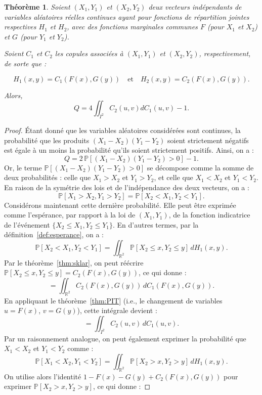 \documentclass[a4paper,11pt]{amsbook}
\numberwithin{equation}{chapter}
\newtheorem{theoreme}			     {Théorème}	[chapter]
\theoremstyle{definition}
\begin{document}
\begin{theoreme}\label{thm:concor}
Soient $(X_1, Y_1)$ et $(X_2, Y_2)$ deux vecteurs indépendants de variables aléatoires réelles continues ayant pour fonctions de répartition jointes respectives $H_1$ et $H_2$, avec des fonctions marginales communes $F$ (pour $X_1$ et $X_2$) et $G$ (pour $Y_1$ et $Y_2$).  

Soient $C_1$ et $C_2$ les copules associées à $(X_1, Y_1)$ et $(X_2, Y_2)$, respectivement, de sorte que :

\[
H_1(x,y) = C_1(F(x),G(y)) \quad \text{et} \quad H_2(x,y) = C_2(F(x),G(y)).
\]

Alors,
\[
Q = 4 \iint_{I^2} C_2(u,v) dC_1(u,v) - 1. 
\]
\end{theoreme}

\begin{proof}
Étant donné que les variables aléatoires considérées sont continues, la probabilité que les produits $(X_1 - X_2)(Y_1 - Y_2)$ soient strictement négatifs est égale à un moins la probabilité qu’ils soient strictement positifs. Ainsi, on a :
\[
Q = 2\, \mathbb{P}\left[(X_1 - X_2)(Y_1 - Y_2) > 0\right] - 1.
\]
Or, le terme $\mathbb{P}\left[(X_1 - X_2)(Y_1 - Y_2) > 0\right]$ se décompose comme la somme de deux probabilités : celle que $X_1 > X_2$ et $Y_1 > Y_2$, et celle que $X_1 < X_2$ et $Y_1 < Y_2$. En raison de la symétrie des lois et de l’indépendance des deux vecteurs, on a :
\[
\mathbb{P}[X_1 > X_2, Y_1 > Y_2] = \mathbb{P}[X_2 < X_1, Y_2 < Y_1].
\]
Considérons maintenant cette dernière probabilité. Elle peut être exprimée comme l’espérance, par rapport à la loi de $(X_1, Y_1)$, de la fonction indicatrice de l’événement $\{X_2 \leq X_1, Y_2 \leq Y_1\}$. En d’autres termes, par la définition~\ref{def:esperance}, on a :
\[
\mathbb{P}[X_2 < X_1, Y_2 < Y_1] = \iint_{\mathbb{R}^2} \mathbb{P}[X_2 \leq x, Y_2 \leq y]\, dH_1(x,y).
\]
Par le théorème~\ref{thm:sklar}, on peut réécrire $\mathbb{P}[X_2 \leq x, Y_2 \leq y] = C_2(F(x), G(y))$, ce qui donne :
\[
= \iint_{\mathbb{R}^2} C_2(F(x), G(y))\, dC_1(F(x), G(y)).
\]
En appliquant le théorème~\ref{thm:PIT} (i.e., le changement de variables $u = F(x)$, $v = G(y)$), cette intégrale devient :
\[
= \iint_{I^2} C_2(u,v)\, dC_1(u,v).
\]
Par un raisonnement analogue, on peut également exprimer la probabilité que $X_1 < X_2$ et $Y_1 < Y_2$ comme :
\[
\mathbb{P}[X_1 < X_2, Y_1 < Y_2] = \iint_{\mathbb{R}^2} \mathbb{P}[X_2 > x, Y_2 > y]\, dH_1(x,y).
\]
On utilise alors l’identité $1 - F(x) - G(y) + C_2(F(x), G(y))$ pour exprimer $\mathbb{P}[X_2 > x, Y_2 > y]$, ce qui donne :

\end{proof}
\end{document}
